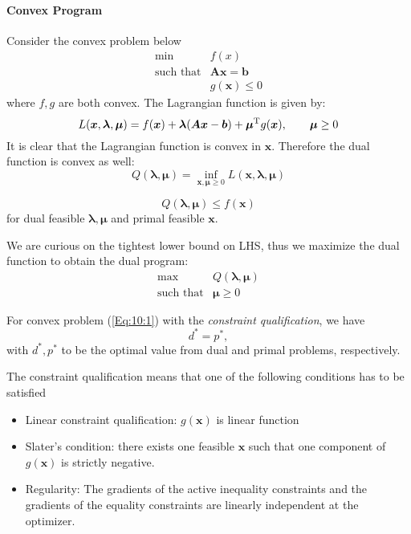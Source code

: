 \paragraph{Convex Program}
Consider the convex problem below
\begin{equation}\label{Eq:10:1}
\begin{array}{ll}
\min&f(x)\\
\mbox{such that}&\bm{Ax}=\bm b\\
&g(\bm x)\le0
\end{array}
\end{equation}
where $f,g$ are both convex. The Lagrangian function is given by:
\[
L(\bm x,\bm\lambda,\bm\mu)=f(\bm x)+\bm\lambda(\bm{Ax}-\bm b)+\bm\mu^{\mathrm T} g(\bm x),
\qquad
\bm\mu\ge0
\]
It is clear that the Lagrangian function is convex in $\bm x$. Therefore the dual function is convex as well:
\[
Q(\bm\lambda,\bm\mu)=\inf_{\bm x,\bm\mu\ge0}L(\bm x,\bm\lambda,\bm\mu)
\]
\begin{proposition}
\[
Q(\bm\lambda,\bm\mu)\le f(\bm x)
\]
for dual feasible $\bm\lambda,\bm\mu$ and primal feasible $\bm x$.
\end{proposition}
We are curious on the tightest lower bound on LHS, thus we maximize the dual function to obtain the dual program:
\begin{equation}
\begin{array}{ll}
\max&Q(\bm\lambda,\bm\mu)\\
\mbox{such that}&\bm\mu\ge0
\end{array}
\end{equation}
\begin{proposition}
For convex problem (\ref{Eq:10:1}) with the \emph{constraint qualification}, we have
\[
d^*=p^*,
\]
with $d^*,p^*$ to be the optimal value from dual and primal problems, respectively.
\end{proposition}
\begin{remark}
The constraint qualification means that one of the following conditions has to be satisfied
\begin{itemize}
\item
Linear constraint qualification: $g(\bm x)$ is linear function
\item
Slater's condition: there exists one feasible $\bm x$ such that one component of $g(\bm x)$ is strictly negative.
\item
Regularity: The gradients of the active inequality constraints and the gradients of the equality constraints are linearly independent at the optimizer.
\end{itemize}
\end{remark}

